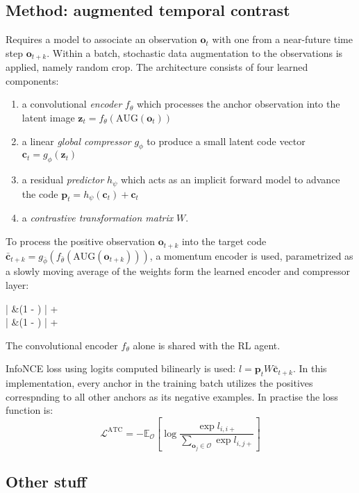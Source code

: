 \documentclass{article}
\begin{document}
\subsection{Method: augmented temporal contrast}
Requires a model to associate an observation $ \bm{o}_{t}  $
with one from a near-future time step $ \bm{o}_{t+k}  $.
Within a batch, stochastic data augmentation to the observations is applied, namely random crop.
The architecture consists of four learned components:
\begin{enumerate}
		\item a convolutional \textit{encoder} $ f_{ \theta }  $ which processes the anchor observation
				into the latent image $ \bm{z}_{t} = f_{ \theta } (\text{AUG}(\bm{o}_{t}))  $
		\item a linear \textit{global compressor} $ g_{ \phi }  $ to produce a small
				latent code vector $ \bm{c}_{t} = g_{ \phi } (\bm{z}_{t})  $
		\item a residual \textit{predictor} $ h_{ \psi }  $ which acts as an implicit forward model
				to advance the code $ \bm{p}_{t} = h_{ \psi } (\bm{c}_{t}) + \bm{c}_{t} $
		\item a \textit{contrastive transformation matrix} $ W  $.
\end{enumerate}
To process the positive observation $ \bm{o}_{t+k}  $ into the target code
$ \bm{\bar{c}}_{t+k} = g_{ \bar{\phi} } (f_{ \bar{\theta} } (\text{AUG} (\bm{o}_{t+k})))  $,
a momentum encoder is used, parametrized as a slowly moving average of the weights form the learned encoder and compressor layer:
\begin{arrange}
		\bar{\theta} &\leftarrow (1 - \tau) \bar{\theta} + \tau \theta \\
		\bar{\phi} &\leftarrow (1 - \tau) \bar{\phi} + \tau \phi \\
\end{arrange}
The convolutional encoder $ f_{ \theta }  $ alone is shared with the RL agent.

InfoNCE loss using logits computed bilinearly is used:
$ l = \bm{p}_{t} W \bm{\bar{c}}_{t+k}  $.
In this implementation, every anchor in the training batch utilizes the positives correspnding to all
other anchors as its negative examples.
In practise the loss function is:
\begin{equation}
\mathcal{L}^{ \text{ATC} } = - \mathbb{E}_{ \mathcal{O} } \left[ 
\log \frac{\exp l_{ i, i+ }}{\sum_{\bm{o}_{j} \in \mathcal{O}}^{} \exp l_{ i,j+ } } 
\right] 
\end{equation}


\subsection{Other stuff}
\end{document}
